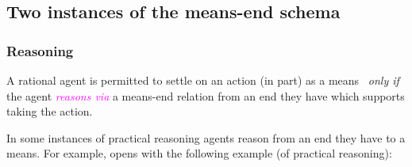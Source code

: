 \documentclass[10pt]{article}
\newenvironment{beamerblock}[1]{%
  \tcolorbox[standard,%
  no shadow,
  noparskip,
  colback=white,
  colframe=black,
  colbacktitle=white,
  coltitle=black,
  colupper=black,
  size=small,
  boxrule=.125mm,
  fonttitle=\bfseries,
  sharp corners=all,
  title=#1]}%
{\endtcolorbox}
\newcommand{\hozlinedash}[0]{%
  \noindent\hdashrule[0.5ex][c]{\textwidth}{.1pt}{2.5pt}
}
\newcommand{\schemaName}[1]{\textsf{#1}}
\begin{document}

\hozlinedash

\newpage

\subsection{Two instances of the means-end schema}
\label{sec:two-instances-means}

\subsubsection{Reasoning}
\label{sec:reasoning}

\begin{beamerblock}{\schemaName{Reasoning}}
  A rational agent is permitted to settle on an action (in part) as a means
  \newline
  \mbox{ }\hfill\emph{only if}\hfill\mbox{ }
  \newline
  the agent \textcolor{fuchsia}{\emph{reasons via}} a means-end relation from an end they have which supports taking the action.
\end{beamerblock}

\hozlinedash

In some instances of practical reasoning agents reason from an end they have to a means.
For example, \citeauthor{Broome:2002aa} opens  with the following example (of practical reasoning):
\end{document}
